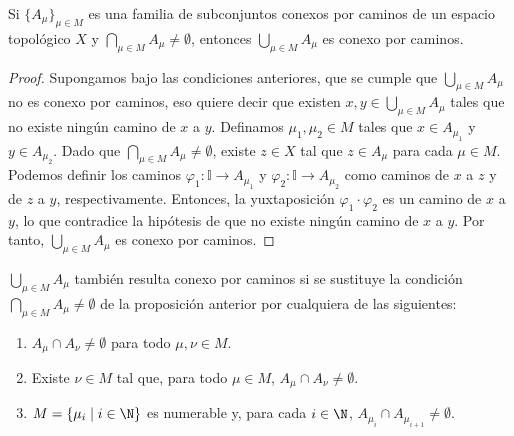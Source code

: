 \begin{proposición}
    Si $\{A_\mu\}_{\mu \in M}$ es una familia de subconjuntos conexos por caminos de un espacio topológico $X$ y $\bigcap_{\mu \in M} A_\mu \neq \emptyset$, entonces $\bigcup_{\mu \in M} A_\mu$ es conexo por caminos.
\end{proposición}
\begin{proof}
    Supongamos bajo las condiciones anteriores, que se cumple que $\bigcup_{\mu \in M} A_{\mu}$ no es conexo por caminos, eso quiere decir que existen $x, y \in \bigcup_{\mu \in M} A_{\mu}$ tales que no existe ningún camino de $x$ a $y$. Definamos $\mu_1, \mu_2 \in M$ tales que $x \in A_{\mu_1}$ y $y \in A_{\mu_2}$. Dado que $\bigcap_{\mu \in M} A_\mu \neq \emptyset$, existe $z \in X$ tal que $z \in A_\mu$ para cada $\mu \in M$. Podemos definir los caminos $\varphi_1 \colon \mathbb{I} \to A_{\mu_1}$ y $\varphi_2 \colon \mathbb{I} \to A_{\mu_2}$ como caminos de $x$ a $z$ y de $z$ a $y$, respectivamente. Entonces, la yuxtaposición $\varphi_1 \cdot \varphi_2$ es un camino de $x$ a $y$, lo que contradice la hipótesis de que no existe ningún camino de $x$ a $y$. Por tanto, $\bigcup_{\mu \in M} A_\mu$ es conexo por caminos.
\end{proof}
\begin{proposición}
    $\bigcup_{\mu \in M} A_\mu$ también resulta conexo por caminos si se sustituye la condición $\bigcap_{\mu \in M} A_\mu \neq \emptyset$ de la proposición anterior por cualquiera de las siguientes:
    \begin{enumerate}[label=\alph*)]
        \item $A_\mu \cap A_\nu \neq \emptyset$ para todo $\mu, \nu \in M$.
        \item Existe $\nu \in M$ tal que, para todo $\mu \in M$, $A_\mu \cap A_\nu \neq \emptyset$.
        \item $M = \{\mu_i \mid i \in \N\}$ es numerable y, para cada $i \in \N$, $A_{\mu_i} \cap A_{\mu_{i+1}} \neq \emptyset$.
    \end{enumerate}
\end{proposición}
